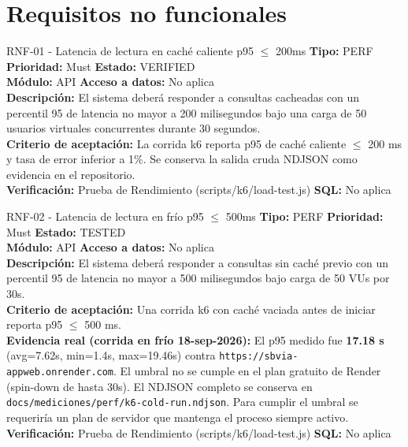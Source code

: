 \documentclass[11pt,a4paper]{article}
\begin{document}
\newpage
\section{Requisitos no funcionales}

\begin{requisito}{RNF-01 - Latencia de lectura en caché caliente p95 $\le$ 200ms}
    \textbf{Tipo:} PERF \quad \textbf{Prioridad:} Must \quad \textbf{Estado:} VERIFIED \\[0.2cm]
    \textbf{Módulo:} API \quad \textbf{Acceso a datos:} No aplica \\[0.2cm]
    \textbf{Descripción:} El sistema deberá responder a consultas cacheadas con un percentil 95 de latencia no mayor a 200 milisegundos bajo una carga de 50 usuarios virtuales concurrentes durante 30 segundos. \\[0.2cm]
    \textbf{Criterio de aceptación:} La corrida k6 reporta p95 de caché caliente $\leq$ 200 ms y tasa de error inferior a 1\%. Se conserva la salida cruda NDJSON como evidencia en el repositorio. \\[0.2cm]
    \textbf{Verificación:} Prueba de Rendimiento (scripts/k6/load-test.js) \quad \textbf{SQL:} No aplica
\end{requisito}

\begin{requisito}{RNF-02 - Latencia de lectura en frío p95 $\le$ 500ms}
    \textbf{Tipo:} PERF \quad \textbf{Prioridad:} Must \quad \textbf{Estado:} TESTED \\[0.2cm]
    \textbf{Módulo:} API \quad \textbf{Acceso a datos:} No aplica \\[0.2cm]
    \textbf{Descripción:} El sistema deberá responder a consultas sin caché previo con un percentil 95 de latencia no mayor a 500 milisegundos bajo carga de 50 VUs por 30s. \\[0.2cm]
    \textbf{Criterio de aceptación:} Una corrida k6 con caché vaciada antes de iniciar reporta p95 $\leq$ 500 ms. \\[0.2cm]
    \textbf{Evidencia real (corrida en frío 18-sep-2026):} El p95 medido fue \textbf{17.18 s} (avg=7.62s, min=1.4s, max=19.46s) contra \texttt{https://sbvia-appweb.onrender.com}. El umbral no se cumple en el plan gratuito de Render (spin-down de hasta 30s). El NDJSON completo se conserva en \texttt{docs/mediciones/perf/k6-cold-run.ndjson}. Para cumplir el umbral se requeriría un plan de servidor que mantenga el proceso siempre activo. \\[0.2cm]
    \textbf{Verificación:} Prueba de Rendimiento (scripts/k6/load-test.js) \quad \textbf{SQL:} No aplica
\end{requisito}
\end{document}
